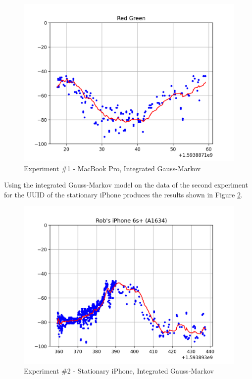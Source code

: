 \documentclass[12pt]{article}
\begin{document}
\begin{figure}[ht]
    \centering
    \includegraphics[width=1.0\textwidth]{Experiment-1-MBP-IGM.png}
    \caption{Experiment \#1 - MacBook Pro, Integrated Gauss-Markov}
    \label{fig:experiment-1-mbp-igm}
\end{figure}

Using the integrated Gauss-Markov model on the data of the second experiment for
the UUID of the stationary iPhone produces the results shown in Figure
\ref{fig:experiment-2-iphone-igm}.

\begin{figure}[ht]
    \centering
    \includegraphics[width=1.0\textwidth]{Experiment-2-iPhone-IGM.png}
    \caption{Experiment \#2 - Stationary iPhone, Integrated Gauss-Markov}
    \label{fig:experiment-2-iphone-igm}
\end{figure}
\end{document}
